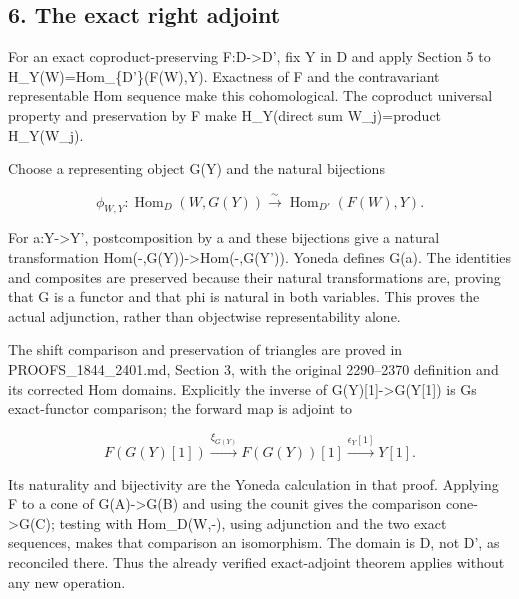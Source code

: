 \subsection{6. The exact right adjoint}\label{proofs-11121-11450-the-exact-right-adjoint}

For an exact coproduct-preserving F:\allowbreak{}D\allowbreak{}->D',\allowbreak{} fix Y in D\textquotesingle{} and apply Section 5 to H\_\allowbreak{}Y(W)\allowbreak{}\allowbreak{}=Hom\_\allowbreak{}\{D'\}(F(W)\allowbreak{},\allowbreak{}Y)\allowbreak{}. Exactness of F and the contravariant representable Hom sequence make this cohomological. The coproduct universal property and preservation by F make H\_\allowbreak{}Y(direct sum W\_\allowbreak{}j)\allowbreak{}\allowbreak{}=product H\_\allowbreak{}Y(W\_\allowbreak{}j)\allowbreak{}.

Choose a representing object G(Y)\allowbreak{} and the natural bijections

\[
 \phi_{W,Y}:\operatorname{Hom}_D(W,G(Y))
        \xrightarrow{\sim}\operatorname{Hom}_{D'}(F(W),Y).
\]

For a:\allowbreak{}Y\allowbreak{}->Y',\allowbreak{} postcomposition by a and these bijections give a natural transformation Hom(-,\allowbreak{}G(Y)\allowbreak{})\allowbreak{}\allowbreak{}->Hom(-,\allowbreak{}G(Y')\allowbreak{})\allowbreak{}. Yoneda defines G(a)\allowbreak{}. The identities and composites are preserved because their natural transformations are,\allowbreak{} proving that G is a functor and that phi is natural in both variables. This proves the actual adjunction,\allowbreak{} rather than objectwise representability alone.

The shift comparison and preservation of triangles are proved in PROOFS\_\allowbreak{}1844\_\allowbreak{}2401.md,\allowbreak{} Section 3,\allowbreak{} with the original 2290–\allowbreak{}2370 definition and its corrected Hom domains. Explicitly the inverse of G(Y)\allowbreak{}[1]\allowbreak{}\allowbreak{}->G(Y[1]\allowbreak{})\allowbreak{} is G\textquotesingle s exact-functor comparison; the forward map is adjoint to

\[
 F(G(Y)[1])\xrightarrow{\xi_{G(Y)}}F(G(Y))[1]
                         \xrightarrow{\epsilon_Y[1]}Y[1].
\]

Its naturality and bijectivity are the Yoneda calculation in that proof. Applying F to a cone of G(A)\allowbreak{}\allowbreak{}->G(B)\allowbreak{} and using the counit gives the comparison cone\allowbreak{}->G(C)\allowbreak{}; testing with Hom\_\allowbreak{}D(W,\allowbreak{}-)\allowbreak{},\allowbreak{} using adjunction and the two exact sequences,\allowbreak{} makes that comparison an isomorphism. The domain is D,\allowbreak{} not D',\allowbreak{} as reconciled there. Thus the already verified exact-adjoint theorem applies without any new operation.

